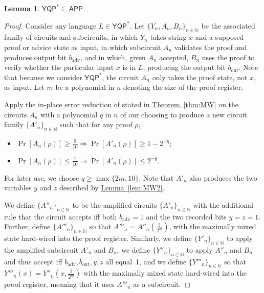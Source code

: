 \documentclass[11pt]{article}
\numberwithin{equation}{section}
\newtheorem{lemma}[theorem]{Lemma}
\theoremstyle{definition}
\theoremstyle{plain}
\newcommand{\N}{\mathbb N}
\newcommand{\expref}[2]{\hyperref[#2]{#1~\ref{#2}}}
\newcommand{\class}[1]{\ensuremath{\mathsf{#1}}\xspace}
\newcommand{\YQPstar}{\class{YQP^*}}
\newcommand{\APP}{\class{APP}}
\newcommand{\bbI}{\mathbb{I}}
\newcommand{\badv}{b_{\text{adv}}}
\newcommand{\bout}{b_{\text{out}}}
\begin{document}
\begin{lemma}\label{lem:YQPinAPP}
	$\YQPstar\subseteq \APP$.
\end{lemma}
\begin{proof}
	Consider any language $L\in \YQPstar$.
	Let $\{Y_n,A_n,B_n\}_{n\in\N}$ be the associated family of circuits
	and subcircuits,
	in which $Y_n$ takes string $x$ and a supposed proof or advice state as input,
	in which subcircuit
	$A_n$ validates the proof and produces output bit $\badv$,
	and in which,
	given $A_n$ accepted, $B_n$ uses the proof to verify whether the particular input
	$x$ is in $L$, producing the output bit $\bout$.
	Note that because we consider $\YQPstar$, the circuit $A_n$ only takes
	the proof state, not $x$, as input.
	Let $m$ be a polynomial in $n$ denoting the size of the
	proof register.
	
	Apply the in-place error reduction of \cite{marriott2005quantum} 
stated in \expref{Theorem}{thm:MW}
	on the circuits $A_n$
	with a polynomial $q$ in $n$ of our choosing
	to produce a new circuit family $\{A'_n\}_{n\in\N}$
	such that for any proof $\rho$,
	\begin{itemize}
		\item $\Pr\left[A_n(\rho)\right] \geq \frac{9}{10} \Rightarrow
		\Pr\left[A'_n(\rho)\right]\geq 1-2^{-q}$;
		\item $\Pr\left[A_n(\rho)\right] \leq \frac{1}{10} \Rightarrow
		\Pr\left[A'_n(\rho)\right]\leq 2^{-q}$.
	\end{itemize}
	For later use, we choose $q \geq \max\{2m,10\}$.
	Note that $A'_n$ also produces the two variables $y$ and $z$ described by \expref{Lemma}{lem:MW2}.
	
	We define $\{A''_n\}_{n\in\N}$ to be the amplified
	circuits $\{A'_n\}_{n\in\N}$ with the additional rule that the circuit
	accepts iff both $\badv=1$ and the two recorded bits $y=z=1$.
	Further, define $\{A'''_n\}_{n\in\N}$ so that $A'''_n = A''_n(\frac{\bbI}{2^m})$,
	with the maximally mixed state hard-wired into the proof register.
	Similarly, we define $\{Y'_n\}_{n\in\N}$ to apply the amplified subcircuit
	$A'_n$ and $B_n$,
	we define $\{Y''_n\}_{n\in\N}$ to apply $A''_n$ and $B_n$ and thus accept iff
	$\badv,\bout,y,z$ all equal~1,
	and we define $\{Y'''_n\}_{n\in\N}$ so that $Y'''_n(x) = Y''_n(x,\frac{\bbI}{2^m})$
	with the maximally mixed state hard-wired into the proof register,
	meaning that it uses $A'''_n$ as a subcircuit.
	

\end{proof}
\end{document}
